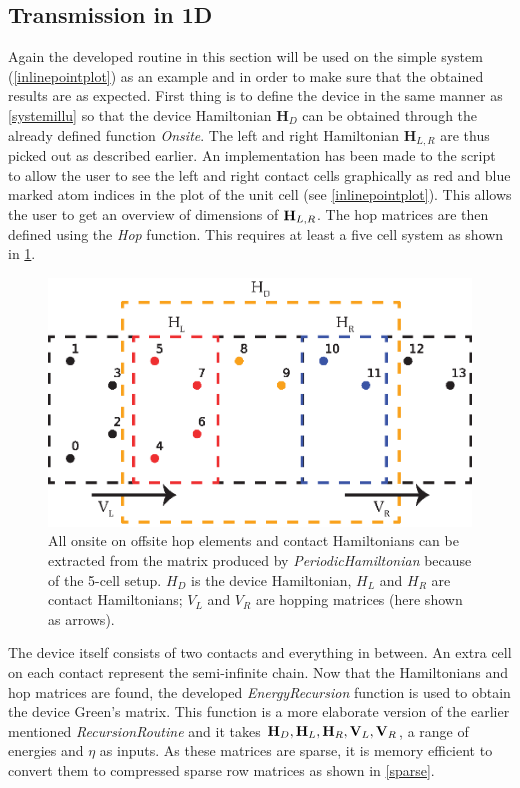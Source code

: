 \subsection{Transmission in 1D}
Again the developed routine in this section will be used on the simple system (\cref{inlinepointplot}) as an example and in order to make sure that the obtained results are as expected. First thing is to define the device in the same manner as \cref{systemillu} so that the device Hamiltonian \(\textbf{H}_D\) can be obtained through the already defined function \textit{Onsite}. The left and right Hamiltonian \(\textbf{H}_{L,R}\) are thus picked out as described earlier. An implementation has been made to the script to allow the user to see the left and right contact cells graphically as red and blue marked atom indices in the plot of the unit cell (see \cref{inlinepointplot}).
This allows the user to get an overview of dimensions of \(\vb{H}_{L,R}\). The hop matrices are then defined using the \textit{Hop} function. This requires at least a five cell system as shown in \cref{2DHammil}.
\begin{figure}[ht]
	\centering
	\includegraphics[width=.6\textwidth]{Figures/2DHam.eps}
	\caption{All onsite on offsite hop elements and contact Hamiltonians can be extracted from the matrix produced by \textit{PeriodicHamiltonian} because of the 5-cell setup. \(H_D\) is the device Hamiltonian, \(H_L\) and \(H_R\) are contact Hamiltonians; \(V_L\) and \(V_R\) are hopping matrices (here shown as arrows).}
	\label{2DHammil}
\end{figure}
The device itself consists of two contacts and everything in between. An extra cell on each contact represent the semi-infinite chain.
Now that the Hamiltonians and hop matrices are found, the developed \textit{EnergyRecursion} function is used to obtain the device Green's matrix. This function is a more elaborate version of the earlier mentioned \textit{RecursionRoutine} and it takes \(\vb{H}_D,\vb{H}_L,\vb{H}_R,\vb{V}_L,\vb{V}_R\), a range of energies and \(\eta\) as inputs. As these matrices are sparse, it is memory efficient to convert them to compressed sparse row matrices as shown in \cref{sparse}.
